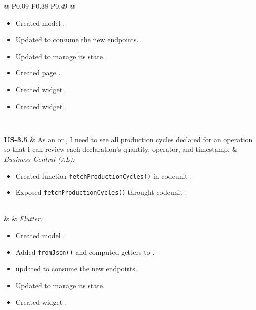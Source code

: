 \begin{longtable}{@{} P{0.09\linewidth} P{0.38\linewidth} P{0.49\linewidth} @{}}
\begin{itemize}[noitemsep, topsep=0pt, partopsep=0pt, leftmargin=*]
		\item Created model .
		\item Updated  to consume the new endpoints.
		\item Updated  to manage its state.
		\item Created page .
		\item Created widget .
		\item Created widget .
	\end{itemize}\\
	\midrule
	
	\textbf{US-3.5}
	& As an  or , I need to see all
	production cycles declared for an operation so that I can review each
	declaration's quantity, operator, and timestamp.
	& \noindent\textit{Business Central (AL):}
	\begin{itemize}[noitemsep, topsep=0pt, partopsep=0pt, leftmargin=*]
		\item Created function \texttt{fetchProductionCycles()} in codeunit .
		\item Exposed \texttt{fetchProductionCycles()} throught codeunit .
	\end{itemize}
\\ & &
	\noindent\textit{Flutter:}
	\begin{itemize}[noitemsep, topsep=0pt, partopsep=0pt, leftmargin=*]
		\item Created model .
		\item Added \texttt{fromJson()} and computed getters to .
		\item updated  to consume the new endpoints.
		\item Updated  to manage its state.
		\item Created widget .
	\end{itemize} \\
\midrule
	

\end{longtable}
